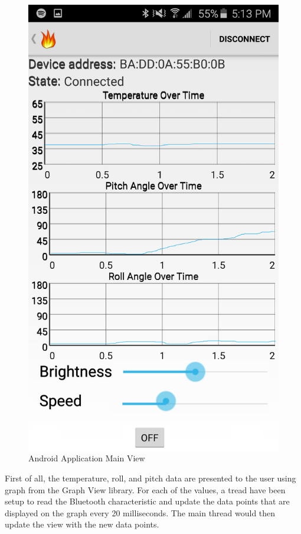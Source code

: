 \documentclass[12pt]{article}
\begin{document}
\begin{figure}[!htb]
 \centering
 \includegraphics[scale=0.15]{images/android.png}
 \caption{Android Application Main View}
 \label{fig:android}
\end{figure}

First of all, the temperature, roll, and pitch data are presented to the user using graph from the Graph View library. For each of the values, a tread have been setup to read the Bluetooth characteristic and update the data points that are displayed on the graph every 20 milliseconds. The main thread would then update the view with the new data points.
\end{document}
